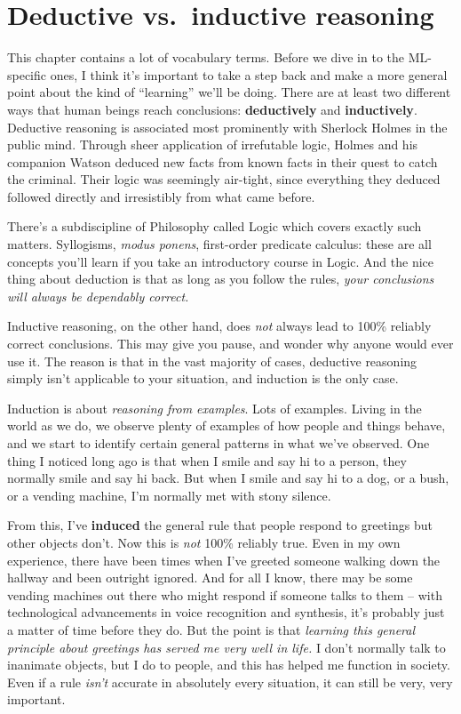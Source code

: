 \section{Deductive vs.~inductive reasoning}


This chapter contains a lot of vocabulary terms. Before we dive in to the
ML-specific ones, I think it's important to take a step back and make a more
general point about the kind of ``learning'' we'll be doing. There are at least
two different ways that human beings reach conclusions: \textbf{deductively}
and \textbf{inductively}. Deductive reasoning is associated most prominently
with Sherlock Holmes in the public mind. Through sheer application of
irrefutable logic, Holmes and his companion Watson deduced new facts from known
facts in their quest to catch the criminal. Their logic was seemingly
air-tight, since everything they deduced followed directly and irresistibly
from what came before.

There's a subdiscipline of Philosophy called Logic which covers exactly such
matters. Syllogisms, \textit{modus ponens}, first-order predicate calculus:
these are all concepts you'll learn if you take an introductory course in
Logic. And the nice thing about deduction is that as long as you follow the
rules, \textit{your conclusions will always be dependably correct.}

Inductive reasoning, on the other hand, does \textit{not} always lead to 100\%
reliably correct conclusions. This may give you pause, and wonder why anyone
would ever use it. The reason is that in the vast majority of cases, deductive
reasoning simply isn't applicable to your situation, and induction is the only
case.

Induction is about \textit{reasoning from examples}. Lots of examples. Living
in the world as we do, we observe plenty of examples of how people and things
behave, and we start to identify certain general patterns in what we've
observed. One thing I noticed long ago is that when I smile and say hi to a
person, they normally smile and say hi back. But when I smile and say hi to a
dog, or a bush, or a vending machine, I'm normally met with stony silence.

From this, I've \textbf{induced} the general rule that people respond to
greetings but other objects don't. Now this is \textit{not} 100\% reliably
true. Even in my own experience, there have been times when I've greeted
someone walking down the hallway and been outright ignored. And for all I know,
there may be some vending machines out there who might respond if someone talks
to them -- with technological advancements in voice recognition and synthesis,
it's probably just a matter of time before they do. But the point is that
\textit{learning this general principle about greetings has served me very well
in life.} I don't normally talk to inanimate objects, but I do to people, and
this has helped me function in society. Even if a rule \textit{isn't} accurate
in absolutely every situation, it can still be very, very important.
 
